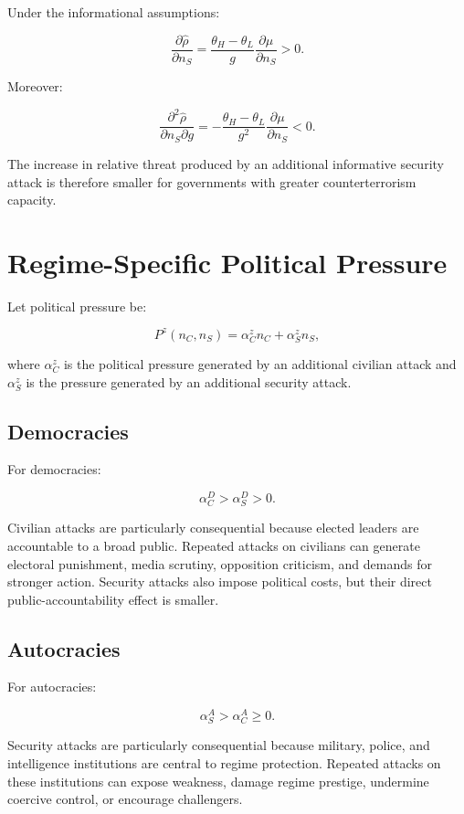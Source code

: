 \documentclass[
  letterpaper,
  DIV=11,
  numbers=noendperiod]{scrartcl}
\begin{document}
Under the informational assumptions:

\[
\frac{\partial\widehat{\rho}}{\partial n_S}
=
\frac{\theta_H-\theta_L}{g}
\frac{\partial\mu}{\partial n_S}>0.
\tag{13}
\]

Moreover:

\[
\boxed{
\frac{\partial^2\widehat{\rho}}
{\partial n_S\partial g}
=
-\frac{\theta_H-\theta_L}{g^2}
\frac{\partial\mu}{\partial n_S}<0.
}
\tag{14}
\]

The increase in relative threat produced by an additional informative
security attack is therefore smaller for governments with greater
counterterrorism capacity.

\section{Regime-Specific Political
Pressure}\label{regime-specific-political-pressure}

Let political pressure be:

\[
P^z(n_C,n_S)
=
\alpha_C^z n_C+\alpha_S^z n_S,
\tag{15}
\]

where \(\alpha_C^z\) is the political pressure generated by an
additional civilian attack and \(\alpha_S^z\) is the pressure generated
by an additional security attack.

\subsection{Democracies}\label{democracies}

For democracies:

\[
\boxed{
\alpha_C^D>\alpha_S^D>0.
}
\tag{A2}
\]

Civilian attacks are particularly consequential because elected leaders
are accountable to a broad public. Repeated attacks on civilians can
generate electoral punishment, media scrutiny, opposition criticism, and
demands for stronger action. Security attacks also impose political
costs, but their direct public-accountability effect is smaller.

\subsection{Autocracies}\label{autocracies}

For autocracies:

\[
\boxed{
\alpha_S^A>\alpha_C^A\geq0.
}
\tag{A3}
\]

Security attacks are particularly consequential because military,
police, and intelligence institutions are central to regime protection.
Repeated attacks on these institutions can expose weakness, damage
regime prestige, undermine coercive control, or encourage challengers.
\end{document}
